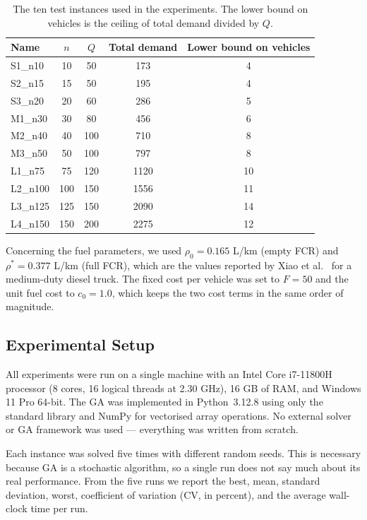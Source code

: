 \documentclass [a4paper, 11pt, titlepage] {article}
\begin{document}
\begin{table}[H]
\centering
\small
\begin{tabular}{|l|c|c|c|c|}
\hline
\textbf{Name} & \textbf{$n$} & \textbf{$Q$} & \textbf{Total demand} & \textbf{Lower bound on vehicles} \\
\hline
S1\_n10  &  10 &  50 &  173 & 4 \\
S2\_n15  &  15 &  50 &  195 & 4 \\
S3\_n20  &  20 &  60 &  286 & 5 \\
M1\_n30  &  30 &  80 &  456 & 6 \\
M2\_n40  &  40 & 100 &  710 & 8 \\
M3\_n50  &  50 & 100 &  797 & 8 \\
L1\_n75  &  75 & 120 & 1120 & 10 \\
L2\_n100 & 100 & 150 & 1556 & 11 \\
L3\_n125 & 125 & 150 & 2090 & 14 \\
L4\_n150 & 150 & 200 & 2275 & 12 \\
\hline
\end{tabular}
\caption{The ten test instances used in the experiments. The lower bound on vehicles is the ceiling of total demand divided by $Q$.}
\label{tab:instances}
\end{table}

Concerning the fuel parameters, we used $\rho_0 = 0.165$ L/km (empty FCR) and $\rho^* = 0.377$ L/km (full FCR), which are the values reported by Xiao et al.\ \cite{xiao2012} for a medium-duty diesel truck. The fixed cost per vehicle was set to $F = 50$ and the unit fuel cost to $c_0 = 1.0$, which keeps the two cost terms in the same order of magnitude.

\subsection{Experimental Setup}
\label{sec:setup}

All experiments were run on a single machine with an Intel Core i7-11800H processor (8 cores, 16 logical threads at 2.30 GHz), 16 GB of RAM, and Windows 11 Pro 64-bit. The GA was implemented in Python~3.12.8 using only the standard library and NumPy for vectorised array operations. No external solver or GA framework was used --- everything was written from scratch.

Each instance was solved five times with different random seeds. This is necessary because GA is a stochastic algorithm, so a single run does not say much about its real performance. From the five runs we report the best, mean, standard deviation, worst, coefficient of variation (CV, in percent), and the average wall-clock time per run.
\end{document}
